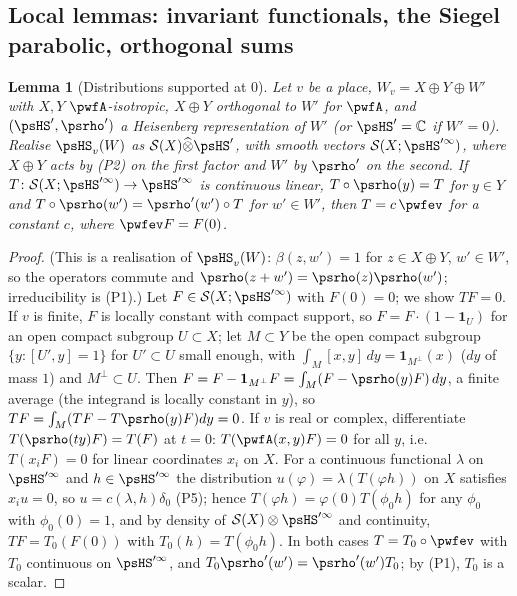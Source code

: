 \documentclass[10pt]{amsart}
\newtheorem{lemma}[theorem]{Lemma}
\theoremstyle{definition}
\theoremstyle{remark}
\newcommand{\C}{\mathbb C}
\providecommand{\auS}{\mathcal S}
\begin{document}
\subsection{Local lemmas: invariant functionals, the Siegel parabolic, orthogonal sums}\label{pwf:ss-local}

\begin{lemma}[Distributions supported at $0$]\label{pwf:dist}
Let $v$ be a place, $W_v=X\oplus Y\oplus W'$ with $X,Y$ $\pwfA$-isotropic, $X\oplus Y$ orthogonal
to $W'$ for $\pwfA$, and $(\psHS',\psrho')$ a Heisenberg representation of $W'$ (or $\psHS'=\C$ if
$W'=0$). Realise $\psHS_v(W)$ as $\auS(X)\widehat\otimes\psHS'$, with smooth vectors
$\auS(X;\psHS'^\infty)$, where $X\oplus Y$ acts by \textup{(P2)} on the first factor and $W'$ by
$\psrho'$ on the second. If $T\colon\auS(X;\psHS'^\infty)\to\psHS'^\infty$ is continuous linear,
$T\circ\psrho(y)=T$ for $y\in Y$ and $T\circ\psrho(w')=\psrho'(w')\circ T$ for $w'\in W'$, then
$T=c\,\pwfev$ for a constant $c$, where $\pwfev F=F(0)$.
\end{lemma}
\begin{proof}
(This is a realisation of $\psHS_v(W)$: $\beta(z,w')=1$ for $z\in X\oplus Y$, $w'\in W'$, so the
operators commute and $\psrho(z+w')=\psrho(z)\psrho(w')$; irreducibility is (P1).) Let $F\in
\auS(X;\psHS'^\infty)$ with $F(0)=0$; we show $TF=0$. If $v$ is finite, $F$ is locally constant
with compact support, so $F=F\cdot(1-\mathbf 1_U)$ for an open compact subgroup $U\subset X$; let
$M\subset Y$ be the open compact subgroup $\{y:[U',y]=1\}$ for $U'\subset U$ small enough, with
$\int_M[x,y]\,dy=\mathbf 1_{M^\perp}(x)$ ($dy$ of mass $1$) and $M^\perp\subset U$. Then
$F=F-\mathbf 1_{M^\perp}F=\int_M(F-\psrho(y)F)\,dy$, a finite average (the integrand is locally
constant in $y$), so $TF=\int_M(TF-T\psrho(y)F)dy=0$. If $v$ is real or complex, differentiate
$T(\psrho(ty)F)=T(F)$ at $t=0$: $T(\pwfA(x,y)F)=0$ for all $y$, i.e.\ $T(x_iF)=0$ for linear
coordinates $x_i$ on $X$. For a continuous functional $\lambda$ on $\psHS'^\infty$ and $h\in
\psHS'^\infty$ the distribution $u(\varphi)=\lambda(T(\varphi h))$ on $X$ satisfies $x_iu=0$, so
$u=c(\lambda,h)\delta_0$ (P5); hence $T(\varphi h)=\varphi(0)T(\phi_0h)$ for any $\phi_0$ with
$\phi_0(0)=1$, and by density of $\auS(X)\otimes\psHS'^\infty$ and continuity, $TF=T_0(F(0))$ with
$T_0(h)=T(\phi_0h)$. In both cases $T=T_0\circ\pwfev$ with $T_0$ continuous on $\psHS'^\infty$, and
$T_0\psrho'(w')=\psrho'(w')T_0$; by (P1), $T_0$ is a scalar.
\end{proof}
\end{document}
